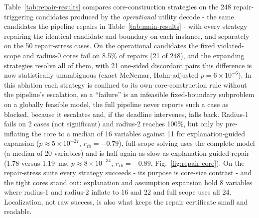 \documentclass[pdflatex,sn-mathphys-num,iicol,oneside]{sn-jnl}
\begin{document}
Table~\ref{tab:repair-results} compares core-construction strategies
on the 248 repair-triggering candidates produced by the
\emph{operational} utility decode - the same candidates the pipeline
repairs in Table~\ref{tab:main-results} - with every strategy
repairing the identical candidate and boundary on each instance, and
separately on the 50 repair-stress cases. On the operational
candidates the fixed violated-scope and radius-0 cores fail on 8.5\%
of repairs (21 of 248), and the expanding strategies resolve all of
them, with 21 one-sided discordant pairs this difference is now
statistically unambiguous (exact McNemar, Holm-adjusted
$p=6\times10^{-6}$). In this ablation each strategy is confined to its
own core-construction rule without the pipeline's escalation, so a
``failure'' is an infeasible fixed-boundary subproblem on a globally
feasible model, the full pipeline never reports such a case as blocked,
because it escalates and, if the deadline intervenes, falls back.
Radius-1 fails on 2 cases (not significant) and
radius-2 reaches 100\%, but only by pre-inflating the core to a median
of 16 variables against 11 for explanation-guided expansion
($p\approx5\times10^{-27}$, $r_{\mathrm{rb}}=-0.79$), full-scope
solving uses the complete model (a median of 20 variables) and is half again as slow
as explanation-guided repair (1.78 versus 1.19~ms,
$p\approx8\times10^{-34}$, $r_{\mathrm{rb}}=-0.89$,
Fig.~\ref{fig:repair-core}). On the repair-stress suite every strategy
succeeds - its purpose is core-size contrast - and the tight cores
stand out: explanation and assumption expansion hold 8 variables where
radius-1 and radius-2 inflate to 16 and 22 and full scope uses all 24.
Localization, not raw success, is also what keeps the repair
certificate small and readable.
\end{document}
